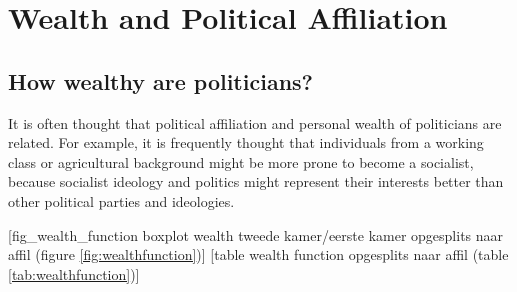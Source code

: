 
\section{Wealth and Political Affiliation}

\subsection{How wealthy are politicians?}
It is often thought that political affiliation and personal wealth of politicians are related. For example, it is frequently thought that individuals from a working class or agricultural background might be more prone to become a socialist, because socialist ideology and politics might represent their interests better than other political parties and ideologies. 


\begin{center}
    
    [fig\_wealth\_function boxplot wealth tweede kamer/eerste kamer opgesplits naar affil (figure \ref{fig:wealthfunction})]
    [table wealth function opgesplits naar affil (table \ref{tab:wealthfunction})]
\end{center}

